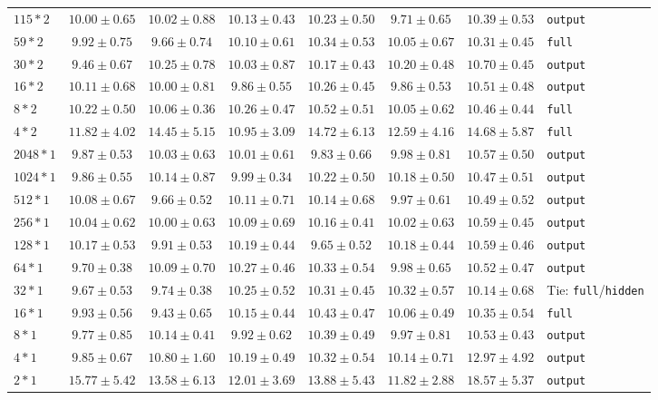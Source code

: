 \documentclass[conference]{IEEEtran}
\begin{document}
\begin{longtable}{@{}lccccccl@{}}
$115*2$ & $10.00 \pm 0.65$ & $10.02 \pm 0.88$ & $10.13 \pm 0.43$ & $10.23 \pm 0.50$ & $9.71 \pm 0.65$ & \bfseries $10.39 \pm 0.53$ & \texttt{output} \\
$59*2$ & $9.92 \pm 0.75$ & $9.66 \pm 0.74$ & $10.10 \pm 0.61$ & \bfseries $10.34 \pm 0.53$ & $10.05 \pm 0.67$ & $10.31 \pm 0.45$ & \texttt{full} \\
$30*2$ & $9.46 \pm 0.67$ & $10.25 \pm 0.78$ & $10.03 \pm 0.87$ & $10.17 \pm 0.43$ & $10.20 \pm 0.48$ & \bfseries $10.70 \pm 0.45$ & \texttt{output} \\
$16*2$ & $10.11 \pm 0.68$ & $10.00 \pm 0.81$ & $9.86 \pm 0.55$ & $10.26 \pm 0.45$ & $9.86 \pm 0.53$ & \bfseries $10.51 \pm 0.48$ & \texttt{output} \\
$8*2$ & $10.22 \pm 0.50$ & $10.06 \pm 0.36$ & $10.26 \pm 0.47$ & \bfseries $10.52 \pm 0.51$ & $10.05 \pm 0.62$ & $10.46 \pm 0.44$ & \texttt{full} \\
$4*2$ & $11.82 \pm 4.02$ & $14.45 \pm 5.15$ & $10.95 \pm 3.09$ & \bfseries $14.72 \pm 6.13$ & $12.59 \pm 4.16$ & $14.68 \pm 5.87$ & \texttt{full} \\
$2048*1$ & $9.87 \pm 0.53$ & $10.03 \pm 0.63$ & $10.01 \pm 0.61$ & $9.83 \pm 0.66$ & $9.98 \pm 0.81$ & \bfseries $10.57 \pm 0.50$ & \texttt{output} \\
$1024*1$ & $9.86 \pm 0.55$ & $10.14 \pm 0.87$ & $9.99 \pm 0.34$ & $10.22 \pm 0.50$ & $10.18 \pm 0.50$ & \bfseries $10.47 \pm 0.51$ & \texttt{output} \\
$512*1$ & $10.08 \pm 0.67$ & $9.66 \pm 0.52$ & $10.11 \pm 0.71$ & $10.14 \pm 0.68$ & $9.97 \pm 0.61$ & \bfseries $10.49 \pm 0.52$ & \texttt{output} \\
$256*1$ & $10.04 \pm 0.62$ & $10.00 \pm 0.63$ & $10.09 \pm 0.69$ & $10.16 \pm 0.41$ & $10.02 \pm 0.63$ & \bfseries $10.59 \pm 0.45$ & \texttt{output} \\
$128*1$ & $10.17 \pm 0.53$ & $9.91 \pm 0.53$ & $10.19 \pm 0.44$ & $9.65 \pm 0.52$ & $10.18 \pm 0.44$ & \bfseries $10.59 \pm 0.46$ & \texttt{output} \\
$64*1$ & $9.70 \pm 0.38$ & $10.09 \pm 0.70$ & $10.27 \pm 0.46$ & $10.33 \pm 0.54$ & $9.98 \pm 0.65$ & \bfseries $10.52 \pm 0.47$ & \texttt{output} \\
$32*1$ & $9.67 \pm 0.53$ & $9.74 \pm 0.38$ & $10.25 \pm 0.52$ & \bfseries $10.31 \pm 0.45$ & \bfseries $10.32 \pm 0.57$ & $10.14 \pm 0.68$ & Tie: \texttt{full}/\texttt{hidden} \\
$16*1$ & $9.93 \pm 0.56$ & $9.43 \pm 0.65$ & $10.15 \pm 0.44$ & \bfseries $10.43 \pm 0.47$ & $10.06 \pm 0.49$ & $10.35 \pm 0.54$ & \texttt{full} \\
$8*1$ & $9.77 \pm 0.85$ & $10.14 \pm 0.41$ & $9.92 \pm 0.62$ & $10.39 \pm 0.49$ & $9.97 \pm 0.81$ & \bfseries $10.53 \pm 0.43$ & \texttt{output} \\
$4*1$ & $9.85 \pm 0.67$ & $10.80 \pm 1.60$ & $10.19 \pm 0.49$ & $10.32 \pm 0.54$ & $10.14 \pm 0.71$ & \bfseries $12.97 \pm 4.92$ & \texttt{output} \\
$2*1$ & $15.77 \pm 5.42$ & $13.58 \pm 6.13$ & $12.01 \pm 3.69$ & $13.88 \pm 5.43$ & $11.82 \pm 2.88$ & \bfseries $18.57 \pm 5.37$ & \texttt{output} \\
\end{longtable}
\end{document}
